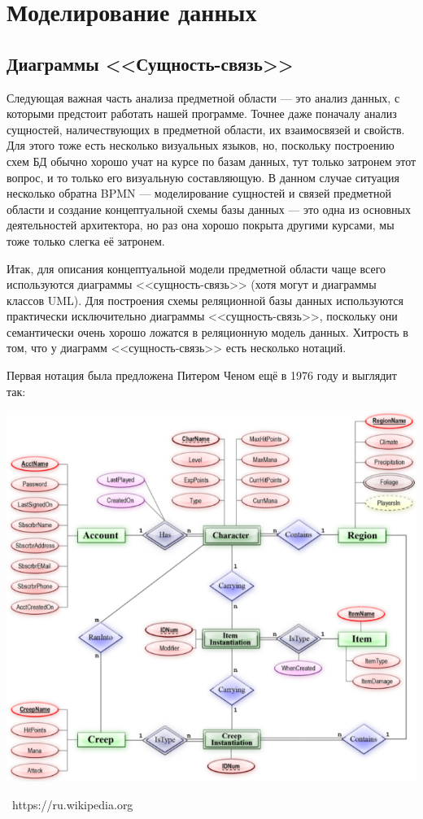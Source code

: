 \documentclass[a5paper]{article}
\newcommand{\attribution}[1] {
    \vspace{-4mm}\begin{flushright}\begin{scriptsize}%
    {\textcopyright\, #1}\end{scriptsize}\end{flushright}
}
\begin{document}
\section{Моделирование данных}

\subsection{Диаграммы <<Сущность-связь>>}

Следующая важная часть анализа предметной области --- это анализ данных, с которыми предстоит работать нашей программе. Точнее даже поначалу анализ сущностей, наличествующих в предметной области, их взаимосвязей и свойств. Для этого тоже есть несколько визуальных языков, но, поскольку построению схем БД обычно хорошо учат на курсе по базам данных, тут только затронем этот вопрос, и то только его визуальную составляющую. В данном случае ситуация несколько обратна BPMN --- моделирование сущностей и связей предметной области и создание концептуальной схемы базы данных --- это одна из основных деятельностей архитектора, но раз она хорошо покрыта другими курсами, мы тоже только слегка её затронем.

Итак, для описания концептуальной модели предметной области чаще всего используются диаграммы <<сущность-связь>> (хотя могут и диаграммы классов UML). Для построения схемы реляционной базы данных используются практически исключительно диаграммы <<сущность-связь>>, поскольку они семантически очень хорошо ложатся в реляционную модель данных. Хитрость в том, что у диаграмм <<сущность-связь>> есть несколько нотаций.

Первая нотация была предложена Питером Ченом ещё в 1976 году и выглядит так:

\begin{center}
    \includegraphics[width=\textwidth]{erChenNotation.png}
    \attribution{https://ru.wikipedia.org}
\end{center}
\end{document}
